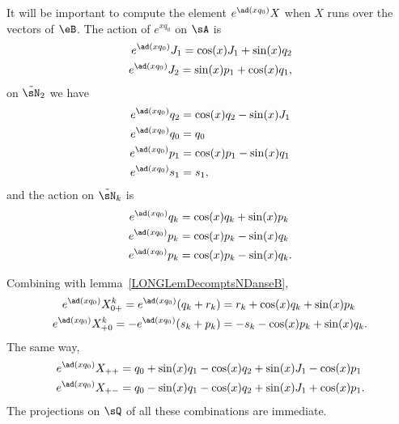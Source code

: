 It will be important to compute the element $ e^{\ad(xq_0)}X$ when $X$ runs over the vectors of $\eB$.
%
The action of $e^{xq_0}$ on $\sA$ is
\begin{subequations}			\label{LONGSubEqsAdxqzJJ}
	\begin{align}
		e^{\ad(xq_0)}J_1=\cos(x)J_1+\sin(x)q_2 \\
		e^{\ad(xq_0)}J_2=\sin(x)p_1+\cos(x)q_1,
	\end{align}
\end{subequations}
on $\tilde\sN_2$ we have
\begin{subequations}					\label{LONGSubEqsexpxzqpsdzuu}
	\begin{align}
		e^{\ad(xq_0)}q_2 & =\cos(x)q_2-\sin(x)J_1                         \\
		e^{\ad(xq_0)}q_0 & =q_0                                           \\
		e^{\ad(xq_0)}p_1 & =\cos(x)p_1-\sin(x)q_1 		\label{LONGEqAdqzpUn} \\
		e^{\ad(xq_0)}s_1 & =s_1,
	\end{align}
\end{subequations}
and the action on $\tilde\sN_k$ is
\begin{subequations}		\label{LONGEqExpAdqkpk}
	\begin{align}
		e^{\ad(xq_0)}q_k & =\cos(x)q_k+\sin(x)p_k  \\
		e^{\ad(xq_0)}p_k & =\cos(x)p_k-\sin(x)q_k  \\
		e^{\ad(xq_0)}p_k & =\cos(x)p_k-\sin(x)q_k.
	\end{align}
\end{subequations}

Combining with lemma~\ref{LONGLemDecomptsNDanseB},
\begin{subequations}			\label{LONGEqExpoQzSurNk}
	\begin{align}
		e^{\ad(xq_0)}X_{0+}^k=e^{\ad(xq_0)}(q_k+r_k)  & =r_k+\cos(x)q_k+\sin(x)p_k		\label{LONGEqExpoQzSurNka} \\
		e^{\ad(xq_0)}X_{+0}^k=-e^{\ad(xq_0)}(s_k+p_k) & =-s_k-\cos(x)p_k+\sin(x)q_k.\label{LONGEqExpoQzSurNkb}
	\end{align}
\end{subequations}
The same way,
\begin{subequations}			\label{LONGEqExpoQzN}
	\begin{align}
		e^{\ad(xq_0)}X_{++} & =q_0+\sin(x)q_1-\cos(x)q_2+\sin(x)J_1-\cos(x)p_1  \\
		e^{\ad(xq_0)}X_{+-} & =q_0-\sin(x)q_1-\cos(x)q_2+\sin(x)J_1+\cos(x)p_1.
	\end{align}
\end{subequations}
The projections on $\sQ$ of all these combinations are immediate.

